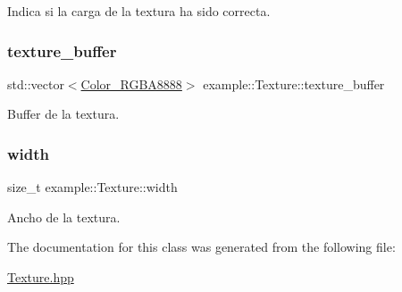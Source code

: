 Indica si la carga de la textura ha sido correcta. 

\mbox{\label{classexample_1_1_texture_ade1ae471d0d7d67854d6924f502a485c}} 
\subsubsection{\texorpdfstring{texture\_buffer}{texture\_buffer}}
{\footnotesize\ttfamily std\+::vector$<$\mbox{\hyperlink{classexample_1_1_color___r_g_b_a8888}{Color\+\_\+\+R\+G\+B\+A8888}}$>$ example\+::\+Texture\+::texture\+\_\+buffer\hspace{0.3cm}{\ttfamily [protected]}}



Buffer de la textura. 

\mbox{\label{classexample_1_1_texture_a7145084592702dbfc07a914186a9bfd5}} 
\subsubsection{\texorpdfstring{width}{width}}
{\footnotesize\ttfamily size\+\_\+t example\+::\+Texture\+::width\hspace{0.3cm}{\ttfamily [protected]}}



Ancho de la textura. 



The documentation for this class was generated from the following file\+:\begin{DoxyCompactItemize}
\item 
\mbox{\hyperlink{_texture_8hpp}{Texture.\+hpp}}\end{DoxyCompactItemize}
